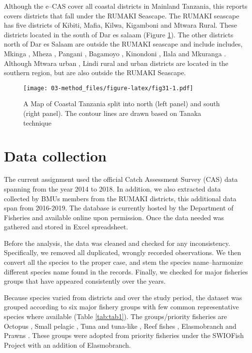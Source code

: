 \documentclass[
  12pt,
  a4paper,
  oneside]{book}
\begin{document}
Although the e--CAS cover all coastal districts in Mainland Tanzania, this reports covers districts that fall under the RUMAKI Seascape. The RUMAKI seascape has five districts of Kibiti, Mafia, Kilwa, Kigamboni and Mtwara Rural. These districts located in the south of Dar es salaam (Figure \ref{fig:fig31}). The other districts north of Dar es Salaam are outside the RUMAKI seascape and include includes, Mkinga , Mheza , Pangani , Bagamoyo , Kinondoni , Ilala  and Mkuranga . Although Mtwara urban , Lindi rural  and urban  districts are located in the southern region, but are also outside the RUMAKI Seascape.

\begin{figure}
\centering
\texttt{[image: 03-method\_files/figure-latex/fig31-1.pdf]}
\caption{\label{fig:fig31}A Map of Coastal Tanzania split into north (left panel) and south (right panel). The contour lines are drawn based on Tanaka technique}
\end{figure}

\hypertarget{data-collection}{%
\section{Data collection}\label{data-collection}}

The current assignment used the official Catch Assessment Survey (CAS) data spanning from the year 2014 to 2018. In addition, we also extracted data collected by BMUs members from the RUMAKI districts, this additional data span from 2016-2019. The database is currently hosted by the Department of Fisheries and available online upon permission. Once the data needed was gathered and stored in Excel spreadsheet.

Before the analysis, the data was cleaned and checked for any inconsistency. Specifically, we removed all duplicated, wrongly recorded observations. We then convert all the species to the proper case, and stem the species name--harmonize different species name found in the records. Finally, we checked for major fisheries groups that have appeared consistently over the years.

Because species varied from districts and over the study period, the dataset was grouped according to six major fishery groups with few common representative species where available (Table \ref{tab:tab1}). The groups/priority fisheries are Octopus , Small pelagic , Tuna and tuna-like , Reef fishes , Elasmobranch  and Prawns . These groups were adopted from priority fisheries under the SWIOFish Project with an addition of Elasmobranch.
\end{document}

